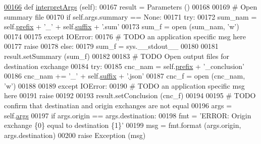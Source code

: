 \begin{DoxyCode}
\hypertarget{classe2e_1_1_application.tex_l00166}{}\hyperlink{classe2e_1_1_application_ae7b9559aa388f8178300fb4d7a9f9257}{00166}     \textcolor{keyword}{def }\hyperlink{classe2e_1_1_application_ae7b9559aa388f8178300fb4d7a9f9257}{interpretArgs} (self):
00167         result = Parameters ()
00168         
00169         \textcolor{comment}{# Open summary file}
00170         \textcolor{keywordflow}{if} self.args.summary == \textcolor{keywordtype}{None}:
00171             \textcolor{keywordflow}{try}:
00172                 sum\_nam =  self.\hyperlink{classe2e_1_1_application_a027ff25e5409ae17584978a09fc2611a}{prefix} + \textcolor{stringliteral}{'\_'} + self.\hyperlink{classe2e_1_1_application_a4d824ad36b051d2d629edb314385df0d}{suffix} + \textcolor{stringliteral}{'.sum'}
00173                 sum\_f = open (sum\_nam, \textcolor{stringliteral}{'w'})
00174                 
00175             \textcolor{keywordflow}{except} IOError:
00176                 \textcolor{comment}{# TODO an application specific msg here}
00177                 \textcolor{keywordflow}{raise}
00178         \textcolor{keywordflow}{else}:
00179             sum\_f = sys.\_\_stdout\_\_
00180             
00181         result.setSummary (sum\_f)
00182             
00183         \textcolor{comment}{# TODO Open output files for destination exchange}
00184         \textcolor{keywordflow}{try}:
00185             cnc\_nam  =  self.\hyperlink{classe2e_1_1_application_a027ff25e5409ae17584978a09fc2611a}{prefix} + \textcolor{stringliteral}{'\_conclusion'}
00186             cnc\_nam += \textcolor{stringliteral}{'\_'} + self.\hyperlink{classe2e_1_1_application_a4d824ad36b051d2d629edb314385df0d}{suffix} + \textcolor{stringliteral}{'.json'}
00187             cnc\_f = open (cnc\_nam, \textcolor{stringliteral}{'w'})
00188             
00189         \textcolor{keywordflow}{except} IOError:
00190             \textcolor{comment}{# TODO an application specific msg here}
00191             \textcolor{keywordflow}{raise}
00192             
00193         result.setConclusion (cnc\_f)
00194             
00195         \textcolor{comment}{# TODO confirm that destinatian and origin exchanges are not equal}
00196         args = self.\hyperlink{classe2e_1_1_application_abade6fc2e2c04ddd7e48137a2a7721bd}{args} 
00197         \textcolor{keywordflow}{if} args.origin == args.destination:
00198             fmt = \textcolor{stringliteral}{'ERROR: Origin exchange \{0\} equal to destination \{1\}'}
00199             msg = fmt.format (args.origin, args.destination)
00200             \textcolor{keywordflow}{raise} Exception (msg)

\end{DoxyCode}
